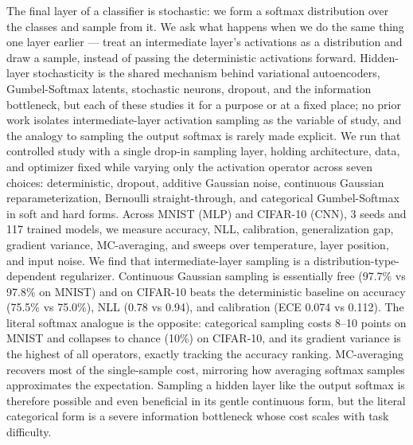 The final layer of a classifier is stochastic: we form a softmax distribution over the classes and sample from it. We ask what happens when we do the same thing one layer earlier --- treat an intermediate layer's activations as a distribution and draw a sample, instead of passing the deterministic activations forward. Hidden-layer stochasticity is the shared mechanism behind variational autoencoders, Gumbel-Softmax latents, stochastic neurons, dropout, and the information bottleneck, but each of these studies it for a purpose or at a fixed place; no prior work isolates intermediate-layer activation sampling as the variable of study, and the analogy to sampling the output softmax is rarely made explicit. We run that controlled study with a single drop-in sampling layer, holding architecture, data, and optimizer fixed while varying only the activation operator across seven choices: deterministic, dropout, additive Gaussian noise, continuous Gaussian reparameterization, Bernoulli straight-through, and categorical Gumbel-Softmax in soft and hard forms. Across MNIST (MLP) and CIFAR-10 (CNN), 3 seeds and 117 trained models, we measure accuracy, NLL, calibration, generalization gap, gradient variance, MC-averaging, and sweeps over temperature, layer position, and input noise. We find that intermediate-layer sampling is a distribution-type-dependent regularizer. Continuous Gaussian sampling is essentially free (97.7\% vs 97.8\% on MNIST) and on CIFAR-10 beats the deterministic baseline on accuracy (75.5\% vs 75.0\%), NLL (0.78 vs 0.94), and calibration (ECE 0.074 vs 0.112). The literal softmax analogue is the opposite: categorical sampling costs 8--10 points on MNIST and collapses to chance (10\%) on CIFAR-10, and its gradient variance is the highest of all operators, exactly tracking the accuracy ranking. MC-averaging recovers most of the single-sample cost, mirroring how averaging softmax samples approximates the expectation. Sampling a hidden layer like the output softmax is therefore possible and even beneficial in its gentle continuous form, but the literal categorical form is a severe information bottleneck whose cost scales with task difficulty.
